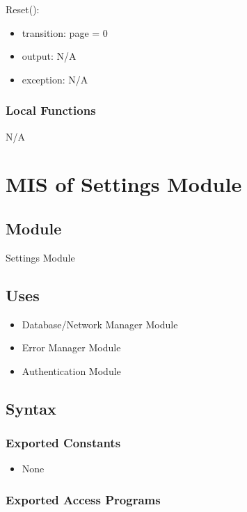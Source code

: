 \documentclass[12pt, titlepage]{article}
\begin{document}
\noindent Reset():
\begin{itemize}
\item transition: page = 0
\item output: N/A
\item exception: N/A
\end{itemize}

\subsubsection{Local Functions}

N/A

\newpage

\section{MIS of Settings Module} \label{Module_Settings}

\subsection{Module}

Settings Module

\subsection{Uses}

\begin{itemize}
  \item Database/Network Manager Module
  \item Error Manager Module
  \item Authentication Module
\end{itemize}

\subsection{Syntax}

\subsubsection{Exported Constants}

\begin{itemize}
  \item None
\end{itemize}

\subsubsection{Exported Access Programs}
\end{document}
